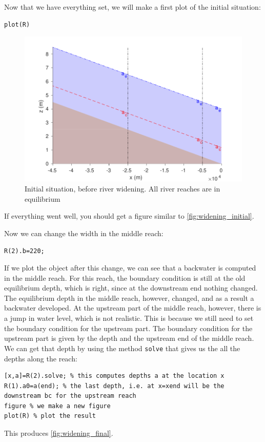 \documentclass[a4paper]{article}
\begin{document}
Now that we have everything set, we will make a first plot of the initial situation:
\begin{lstlisting}
plot(R)
\end{lstlisting}

\begin{figure}[h]
  \centering
  \includegraphics{widening_initial.pdf}
  \caption{Initial situation, before river widening. All river reaches are in equilibrium}
  \label{fig:widening_initial}
\end{figure}
If everything went well, you should get a figure similar to \autoref{fig:widening_initial}.

Now we can change the width in the middle reach:
\begin{lstlisting}
R(2).b=220;
\end{lstlisting}
If we plot the object after this change, we can see that a backwater is computed in the middle reach. For this reach, the boundary condition is still at the old equilibrium depth, which is right, since at the downstream end nothing changed. The equilibrium depth in the middle reach, however, changed, and as a result a backwater developed. At the upstream part of the middle reach, however, there is a jump in water level, which is not realistic. This is because we still need to set the boundary condition for the upstream part. The boundary condition for the upstream part is given by the depth and the upstream end of the middle reach. We can get that depth by using the method \lstinline{solve} that gives us the all the depths along the reach:
\begin{lstlisting}
[x,a]=R(2).solve; % this computes depths a at the location x
R(1).a0=a(end); % the last depth, i.e. at x=xend will be the downstream bc for the upstream reach
figure % we make a new figure
plot(R) % plot the result
\end{lstlisting}
This produces \autoref{fig:widening_final}.
\end{document}
